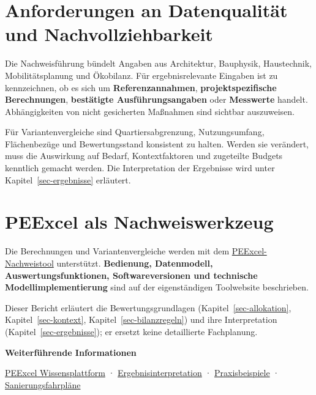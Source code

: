 \documentclass[
  ngerman,
  a4paper,
  DIV=11]{scrreprt}
\begin{document}
\section{Anforderungen an Datenqualität und
Nachvollziehbarkeit}\label{anforderungen-an-datenqualituxe4t-und-nachvollziehbarkeit}

Die Nachweisführung bündelt Angaben aus Architektur, Bauphysik,
Haustechnik, Mobilitätsplanung und Ökobilanz. Für ergebnisrelevante
Eingaben ist zu kennzeichnen, ob es sich um \textbf{Referenzannahmen},
\textbf{projektspezifische Berechnungen}, \textbf{bestätigte
Ausführungsangaben} oder \textbf{Messwerte} handelt. Abhängigkeiten von
nicht gesicherten Maßnahmen sind sichtbar auszuweisen.

Für Variantenvergleiche sind Quartiersabgrenzung, Nutzungsumfang,
Flächenbezüge und Bewertungsstand konsistent zu halten. Werden sie
verändert, muss die Auswirkung auf Bedarf, Kontextfaktoren und
zugeteilte Budgets kenntlich gemacht werden. Die Interpretation der
Ergebnisse wird unter Kapitel~\ref{sec-ergebnisse} erläutert.

\section{\texorpdfstring{\href{../Abbildungen/logo.svg}{} PEExcel als
Nachweiswerkzeug}{ PEExcel als Nachweiswerkzeug}}\label{peexcel-als-nachweiswerkzeug}

Die Berechnungen und Variantenvergleiche werden mit dem
\href{https://simonschaluppe.github.io/peexcel/}{PEExcel-Nachweistool}
unterstützt. \textbf{Bedienung, Datenmodell, Auswertungsfunktionen,
Softwareversionen und technische Modellimplementierung} sind auf der
eigenständigen Toolwebsite beschrieben.

Dieser Bericht erläutert die Bewertungsgrundlagen
(Kapitel~\ref{sec-allokation}, Kapitel~\ref{sec-kontext},
Kapitel~\ref{sec-bilanzregeln}) und ihre Interpretation
(Kapitel~\ref{sec-ergebnisse}); er ersetzt keine detaillierte
Fachplanung.

\begin{tcolorbox}[enhanced jigsaw, arc=.35mm, bottomrule=.15mm, breakable, colback=white, colframe=quarto-callout-tip-color-frame, left=2mm, leftrule=.75mm, opacityback=0, rightrule=.15mm, toprule=.15mm]

\vspace{-3mm}\textbf{Weiterführende Informationen}\vspace{3mm}

\href{https://simonschaluppe.github.io/peexcel/}{PEExcel
Wissensplattform} · \href{07-ergebnisse.qmd}{Ergebnisinterpretation} ·
\href{07-praxisbeispiele.qmd}{Praxisbeispiele} ·
\href{07-renovierungsfahrplan.qmd}{Sanierungsfahrpläne}

\end{tcolorbox}
\end{document}
